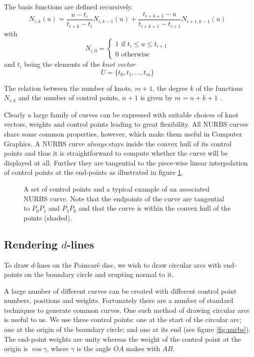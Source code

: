 The basis functions are defined recursively.
\[
N_{i,k}(u) = \frac{u - t_i}{t_{i+k} - t_i} N_{i,k-1}(u) +
  \frac{t_{i+k+1} - u}{t_{i+k+1} - t_{i+1}} N_{i+1,k-1}(u)
\]
with
\[
N_{i,0} = 
\begin{cases}
1 \mbox{ if } t_i \le u \le t_{i+1} \\ 
0 \mbox{ otherwise} 
\end{cases}
\]
and $t_i$ being the elements of the \emph{knot vector}
\[
U = \{ t_0, t_1, ... , t_m \}
\]

The relation between the number of knots, $m+1$, the degree $k$ of 
the functions $N_{i,k}$ and the number of control points, $n+1$
is given by $m = n + k + 1$ \cite{peigl, rogers}.

Clearly a large family of curves can be expressed with suitable choices
of knot vectors, weights and control points leading to great flexibility.
All NURBS curves share some common properties, however, which make them
useful in Computer Graphics. A NURBS curve \emph{always} stays inside the
convex hull of its control points \cite{rogers} and thus it is straightforward
to compute whether the curve will be displayed at all. Further they
are tangential to the piece-wise linear interpolation of control
points at the end-points as illustrated in figure \ref{fig:samplenurb}.

\begin{figure} \centering
{}
\caption{A set of control points and a typical example of an associated
NURBS curve. Note that the endpoints of the curve are tangential to
$P_0P_1$ and $P_5P_6$ and that the curve is within the convex hull
of the points (shaded).}
\label{fig:samplenurb}
\end{figure}

\subsection{Rendering $d$-lines}

To draw $d$-lines on the Poincar\'e disc, we wish to draw circular arcs
with end-points on the boundary circle and erupting normal to it.

A large number of different curves can be created with different control 
point numbers, positions and weights. Fortunately there are a number of
standard techniques to generate common curves. One such method of
drawing circular arcs\cite{NURBS:arc} is useful to us. We use three control
points: one at the start of the circular arc; one at the origin of the
boundary circle; and one
at its end (see figure \ref{fig:nurbs}). 
The end-point weights are unity whereas the weight of the control
point at the origin is $\cos \gamma$, where $\gamma$ is the angle
$OA$ makes with $AB$.


